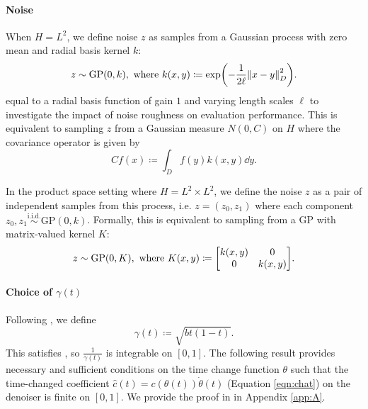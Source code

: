 \paragraph{Noise}
When \(H = L^{2}\), we define noise \(z\) as samples from a Gaussian process \citep{williams2006gaussian} with zero mean and radial basis kernel \(k\):
\[
  z \sim \mathrm{GP}(0, k), \text{ where } k(x, y) \coloneqq \exp(-\frac{1}{2\ell} \norm{x - y}^{2}_{D}).
\] equal to a radial basis function of gain \(1\) and varying length scales \(\ell\) to investigate the impact of noise roughness on evaluation performance. This is equivalent to sampling \(z\) from a Gaussian measure \(N(0, C)\) on \(H\) where the covariance operator is given by
\[
  Cf(x) \coloneqq \int_{D} f(y) k(x, y) \dd{y}.
\]

In the product space setting where \(H = L^{2} \times L^{2}\), we define the noise \(z\) as a pair of independent samples from this process, i.e. \(z = (z_{0}, z_{1})\) where each component \(z_{0}, z_{1} \overset{\text{i.i.d.}}{\sim} \mathrm{GP}(0, k)\). Formally, this is equivalent to sampling from a GP with matrix-valued kernel \(K\):
\[
  z \sim \mathrm{GP}(0, K), \text{ where } K(x, y) \coloneqq \mqty[k(x,y) & 0 \\ 0 & k(x,y)].
\]

\paragraph{Choice of \(\gamma(t)\)} Following \citep{albergo2023stochasticinterpolantsunifyingframework}, we define
\[
  \gamma(t) \coloneqq \sqrt{bt(1-t)}.
\]
This satisfies , so \(\frac{1}{\gamma(t)}\) is integrable on \([0, 1]\). The following result provides necessary and sufficient conditions on the time change function \(\theta\) such that the time-changed coefficient \(\hat{c}(t) = c(\theta(t)) \dot{\theta}(t)\) (Equation \ref{eqn:chat}) on the denoiser is finite on \([0, 1]\). We provide the proof in  in Appendix \ref{app:A}.

